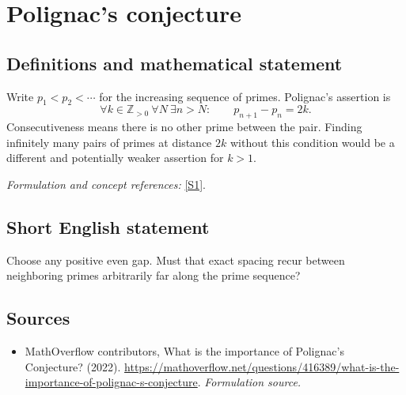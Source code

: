 \documentclass[11pt]{article}
\begin{document}
\section*{\texorpdfstring{Polignac's conjecture}{Polignac's conjecture}}\label{106}
\subsection{Definitions and mathematical statement}
Write $p_1<p_2<\cdots$ for the increasing sequence of primes. Polignac's assertion is
\[
 \forall k\in{\mathbb{Z}}_{>0}\ \forall N\ \exists n>N:\qquad p_{n+1}-p_n=2k.
\]
Consecutiveness means there is no other prime between the pair. Finding infinitely many pairs of primes at distance $2k$ without this condition would be a different and potentially weaker assertion for $k>1$.
\par\smallskip\textit{Formulation and concept references:} \href{https://mathoverflow.net/questions/416389/what-is-the-importance-of-polignac-s-conjecture}{[S1]}.

\subsection{Short English statement}
Choose any positive even gap. Must that exact spacing recur between neighboring primes arbitrarily far along the prime sequence?
\subsection{Sources}
\begin{itemize}
\item[S1]MathOverflow contributors, What is the importance of Polignac's Conjecture? (2022).
\url{https://mathoverflow.net/questions/416389/what-is-the-importance-of-polignac-s-conjecture}.
\textit{Formulation source.}
\end{itemize}
\end{document}

